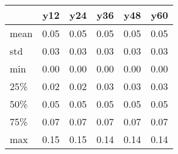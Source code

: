\begin{tabular}{lrrrrr}
\toprule
{} &  y12 &  y24 &  y36 &  y48 &  y60 \\
\midrule
mean & 0.05 & 0.05 & 0.05 & 0.05 & 0.05 \\
std  & 0.03 & 0.03 & 0.03 & 0.03 & 0.03 \\
min  & 0.00 & 0.00 & 0.00 & 0.00 & 0.00 \\
25\%  & 0.02 & 0.02 & 0.03 & 0.03 & 0.03 \\
50\%  & 0.05 & 0.05 & 0.05 & 0.05 & 0.05 \\
75\%  & 0.07 & 0.07 & 0.07 & 0.07 & 0.07 \\
max  & 0.15 & 0.15 & 0.14 & 0.14 & 0.14 \\
\bottomrule
\end{tabular}
